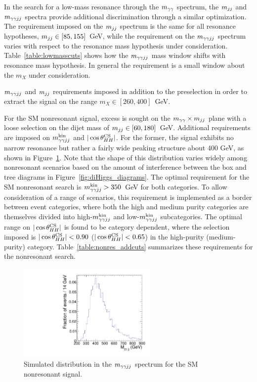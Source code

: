 In the search for a low-mass resonance through the $m_{\gamma\gamma}$ spectrum, the $m_{jj}$ and $m_{\gamma\gamma jj}$ spectra
provide additional discrimination through a similar optimization. The requirement imposed
on the $m_{jj}$ spectrum is the same for all resonance hypotheses, $m_{jj} \in [85,155]$~GeV, while the
requirement on the $m_{\gamma\gamma jj}$ spectrum varies with respect to the resonance mass hypothesis
under consideration.
Table~\ref{table:lowmasscuts} shows how the $m_{\gamma\gamma jj}$ mass window shifts with resonance mass hypothesis.
In general the requirement is a small window about the $m_X$ under consideration.

\begin{table}[htbp!]
  \centering
  \renewcommand{\arraystretch}{1.4}
  \caption{$m_{\gamma\gamma jj}$ and $m_{jj}$ requirements imposed in addition to the preselection in order to extract
the signal on the range $m_X \in [260, 400]$~GeV.}
  
  \label{table:lowmasscuts}
\end{table}

For the SM nonresonant signal, excess is sought on the $m_{\gamma\gamma} \times m_{jj}$ plane with a
loose selection on the dijet mass of $m_{jj} \in [60, 180]$~GeV.
Additional requirements are imposed on $m_{\gamma\gamma jj}^{\rm kin}$ and $|\cos {\theta^{\rm CS}_{HH}}|$. For the former, the signal
exhibits no narrow resonance but rather a fairly wide peaking structure about 400 GeV, as shown in
Figure~\ref{fig:ggHH_4body}.
Note that the shape of this distribution varies widely among nonresonant scenarios based on
the amount of interference between the box and tree diagrams in Figure~\ref{fig:diHiggs_diagrams}.
The optimal requirement for the SM nonresonant search is $m_{\gamma\gamma jj}^{\rm kin} > 350$~GeV for both categories.
To allow consideration of a range of scenarios, this requirement is implemented as a border
between event categories, where both the high and medium purity categories are themselves divided into
high-$m_{\gamma\gamma jj}^{\rm kin}$ and low-$m_{\gamma\gamma jj}^{\rm kin}$ subcategories.
The optimal range on $|\cos {\theta^{\rm CS}_{HH}}|$ is found to be category dependent, where the selection imposed
is $|\cos {\theta^{\rm CS}_{HH}}| < 0.90$ ($|\cos {\theta^{\rm CS}_{HH}}| < 0.65$) in the high-purity (medium-purity) category.
Table~\ref{table:nonres_addcuts} summarizes these requirements for the nonresonant search.

\begin{figure}[htbp!]
 \begin{center}
   \includegraphics[width=0.6\textwidth]{figures/selection/ggHH_4body.pdf}
 \end{center}
\caption{Simulated distribution in the $m_{\gamma\gamma jj}$ spectrum for the SM nonresonant signal.}
\label{fig:ggHH_4body}
\end{figure}



